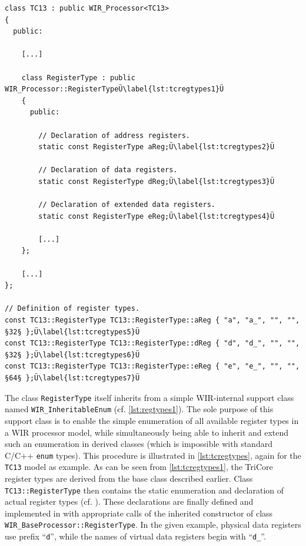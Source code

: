 \begin{lstlisting}[style=code,float=t,caption={Concrete Register Type Handling (here for Class \texttt{TC13})},label=lst:tcregtypes]
class TC13 : public WIR_Processor<TC13>
{
  public:

    [...]

    class RegisterType : public WIR_Processor::RegisterTypeÜ\label{lst:tcregtypes1}Ü
    {
      public:

        // Declaration of address registers.
        static const RegisterType aReg;Ü\label{lst:tcregtypes2}Ü

        // Declaration of data registers.
        static const RegisterType dReg;Ü\label{lst:tcregtypes3}Ü

        // Declaration of extended data registers.
        static const RegisterType eReg;Ü\label{lst:tcregtypes4}Ü

        [...]
    };

    [...]
};

// Definition of register types.
const TC13::RegisterType TC13::RegisterType::aReg { "a", "a_", "", "", §32§ };Ü\label{lst:tcregtypes5}Ü
const TC13::RegisterType TC13::RegisterType::dReg { "d", "d_", "", "", §32§ };Ü\label{lst:tcregtypes6}Ü
const TC13::RegisterType TC13::RegisterType::eReg { "e", "e_", "", "", §64§ };Ü\label{lst:tcregtypes7}Ü
\end{lstlisting}

The class \texttt{RegisterType} itself inherits from a simple \gls{WIR}-internal support class named \texttt{WIR\_InheritableEnum} (cf. \cref{lst:regtypes1}).
The sole purpose of this support class is to enable the simple enumeration of all available register types in a \gls{WIR} processor model, while simultaneously being able to inherit and extend such an enumeration in derived classes (which is impossible with standard C/C++ \texttt{enum} types).
This procedure is illustrated in \cref{lst:tcregtypes}, again for the \texttt{TC13} model as example.
As can be seen from \cref{lst:tcregtypes1}, the TriCore register types are derived from the base class described earlier.
Class \texttt{TC13::RegisterType} then contains the static enumeration and declaration of actual register types (cf. ).
These declarations are finally defined and implemented in  with appropriate calls of the inherited constructor of class \texttt{WIR\_BaseProcessor::RegisterType}.
In the given example, physical data registers use prefix ``\texttt{d}'', while the names of virtual data registers begin with ``\texttt{d\_}''.


